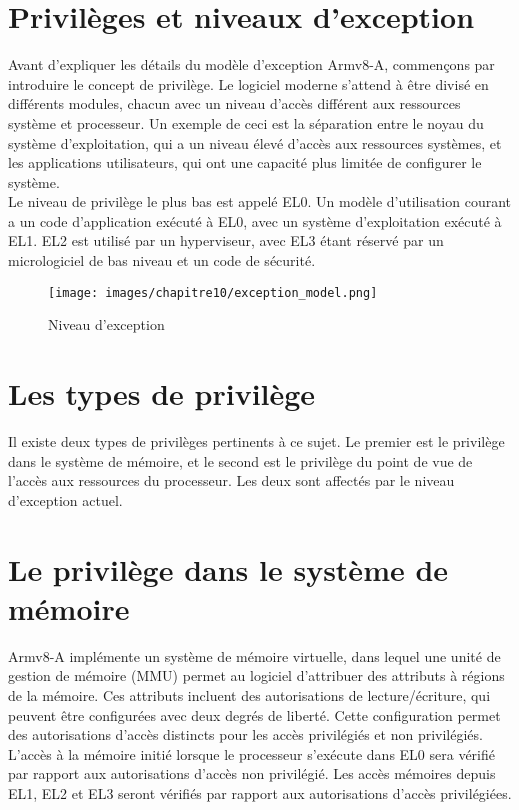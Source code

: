 \documentclass[12pt,a4paper,oneside]{book}
\begin{document}
	
	\section{Privilèges et niveaux d'exception}
	Avant d'expliquer les détails du modèle d'exception Armv8-A, commençons par introduire le concept de privilège. Le logiciel moderne s'attend à être divisé en différents modules, chacun avec un niveau d'accès différent aux ressources système et processeur. Un exemple de ceci est la séparation entre le noyau du système d'exploitation, qui a un niveau élevé d'accès aux ressources systèmes, et les applications utilisateurs, qui ont une capacité plus limitée de configurer le système.\\
	
	Le niveau de privilège le plus bas est appelé EL0.
	Un modèle d'utilisation courant a un code d'application exécuté à EL0, avec un système d'exploitation exécuté à EL1. EL2 est utilisé par un hyperviseur, avec EL3 étant réservé par un micrologiciel de bas niveau et un code de sécurité.
	
	
	\begin{figure}[H]
		\centering
		\texttt{[image: images/chapitre10/exception\_model.png]}
		\caption{Niveau d'exception}
		\label{Types}
	\end{figure}
	
	
	\section{Les types de privilège}
	
	Il existe deux types de privilèges pertinents à ce sujet. Le premier est le privilège dans le système de mémoire, et le second est le privilège du point de vue de l'accès aux ressources du processeur. Les deux sont affectés par le niveau d'exception actuel.
	
	\section{Le privilège dans le système de mémoire}
	
	Armv8-A implémente un système de mémoire virtuelle, dans lequel une unité de gestion de mémoire (MMU) permet au logiciel d'attribuer des attributs à régions de la mémoire. Ces attributs incluent des autorisations de lecture/écriture, qui peuvent être configurées avec deux degrés de liberté. Cette configuration permet des autorisations d'accès distincts pour les accès privilégiés et non privilégiés.
	L'accès à la mémoire initié lorsque le processeur s'exécute dans EL0 sera vérifié par rapport aux autorisations d'accès non privilégié. Les accès mémoires depuis EL1, EL2 et EL3 seront vérifiés par rapport aux autorisations d'accès privilégiées.
	
\end{document}
